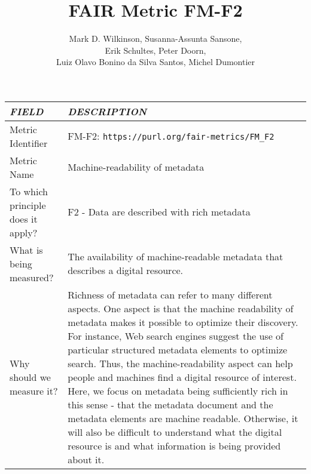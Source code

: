 \documentclass[english]{article}
\begin{document}
\title{FAIR Metric FM-F2}

\author{Mark D. Wilkinson, Susanna-Assunta Sansone, \\Erik Schultes, Peter Doorn,\\ 
Luiz Olavo Bonino da Silva Santos, Michel Dumontier}

\maketitle


\centering

\begin{tabular}{|p{5cm}|p{9cm}|}
\hline
\emph{FIELD} & \emph{DESCRIPTION} \\
\hline
Metric Identifier &   FM-F2: \verb"https://purl.org/fair-metrics/FM_F2"
 \\


\hline
Metric Name &   
Machine-readability of metadata

 \\



\hline
To which principle does it apply? &   F2 - Data are described with rich metadata\\



\hline
What is being measured? & 

The availability of machine-readable metadata that describes a digital resource.\\



\hline
Why should we measure it? & 


Richness of metadata can refer to many different aspects. One aspect is that the machine readability of metadata makes it possible to optimize their discovery. For instance, Web search engines suggest the use of particular structured metadata elements to optimize search. Thus, the machine-readability aspect can help people and machines find a digital resource of interest. Here, we focus on metadata being sufficiently rich in this sense - that the metadata document and the metadata elements are machine readable.  Otherwise, it will also be difficult to understand what the digital resource is and what information is being provided about it.

  
\\




\end{tabular}
\end{document}
